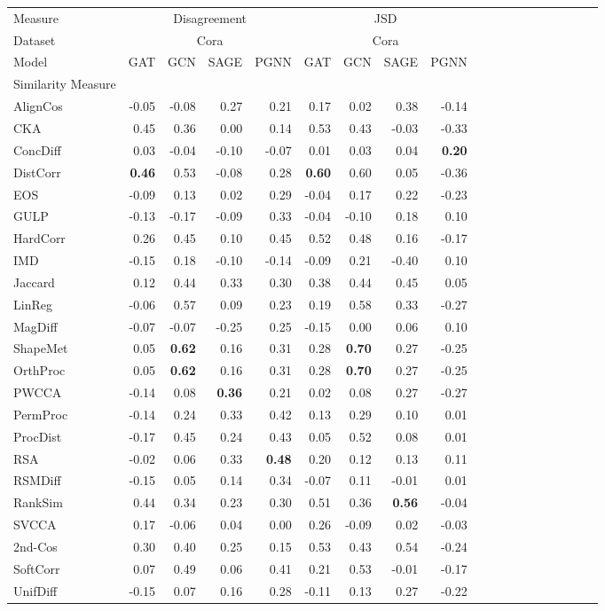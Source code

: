 \begin{tabular}{l||rrr|rrr|rrr||rrr|rrr|rrr}
\toprule
Measure & \multicolumn{4}{c}{Disagreement} & \multicolumn{4}{c}{JSD} \\
Dataset & \multicolumn{4}{c}{Cora} & \multicolumn{4}{c}{Cora} \\
Model & GAT & GCN & SAGE & PGNN & GAT & GCN & SAGE & PGNN \\
Similarity Measure &  &  &  &  &  &  &  &  \\
\midrule
AlignCos & -0.05 & -0.08 & 0.27 & 0.21 & 0.17 & 0.02 & 0.38 & -0.14 \\
CKA & 0.45 & 0.36 & 0.00 & 0.14 & 0.53 & 0.43 & -0.03 & -0.33 \\
ConcDiff & 0.03 & -0.04 & -0.10 & -0.07 & 0.01 & 0.03 & 0.04 & \textbf{0.20} \\
DistCorr & \textbf{0.46} & 0.53 & -0.08 & 0.28 & \textbf{0.60} & 0.60 & 0.05 & -0.36 \\
EOS & -0.09 & 0.13 & 0.02 & 0.29 & -0.04 & 0.17 & 0.22 & -0.23 \\
GULP & -0.13 & -0.17 & -0.09 & 0.33 & -0.04 & -0.10 & 0.18 & 0.10 \\
HardCorr & 0.26 & 0.45 & 0.10 & 0.45 & 0.52 & 0.48 & 0.16 & -0.17 \\
IMD & -0.15 & 0.18 & -0.10 & -0.14 & -0.09 & 0.21 & -0.40 & 0.10 \\
Jaccard & 0.12 & 0.44 & 0.33 & 0.30 & 0.38 & 0.44 & 0.45 & 0.05 \\
LinReg & -0.06 & 0.57 & 0.09 & 0.23 & 0.19 & 0.58 & 0.33 & -0.27 \\
MagDiff & -0.07 & -0.07 & -0.25 & 0.25 & -0.15 & 0.00 & 0.06 & 0.10 \\
ShapeMet & 0.05 & \textbf{0.62} & 0.16 & 0.31 & 0.28 & \textbf{0.70} & 0.27 & -0.25 \\
OrthProc & 0.05 & \textbf{0.62} & 0.16 & 0.31 & 0.28 & \textbf{0.70} & 0.27 & -0.25 \\
PWCCA & -0.14 & 0.08 & \textbf{0.36} & 0.21 & 0.02 & 0.08 & 0.27 & -0.27 \\
PermProc & -0.14 & 0.24 & 0.33 & 0.42 & 0.13 & 0.29 & 0.10 & 0.01 \\
ProcDist & -0.17 & 0.45 & 0.24 & 0.43 & 0.05 & 0.52 & 0.08 & 0.01 \\
RSA & -0.02 & 0.06 & 0.33 & \textbf{0.48} & 0.20 & 0.12 & 0.13 & 0.11 \\
RSMDiff & -0.15 & 0.05 & 0.14 & 0.34 & -0.07 & 0.11 & -0.01 & 0.01 \\
RankSim & 0.44 & 0.34 & 0.23 & 0.30 & 0.51 & 0.36 & \textbf{0.56} & -0.04 \\
SVCCA & 0.17 & -0.06 & 0.04 & 0.00 & 0.26 & -0.09 & 0.02 & -0.03 \\
2nd-Cos & 0.30 & 0.40 & 0.25 & 0.15 & 0.53 & 0.43 & 0.54 & -0.24 \\
SoftCorr & 0.07 & 0.49 & 0.06 & 0.41 & 0.21 & 0.53 & -0.01 & -0.17 \\
UnifDiff & -0.15 & 0.07 & 0.16 & 0.28 & -0.11 & 0.13 & 0.27 & -0.22 \\
\bottomrule
\end{tabular}
